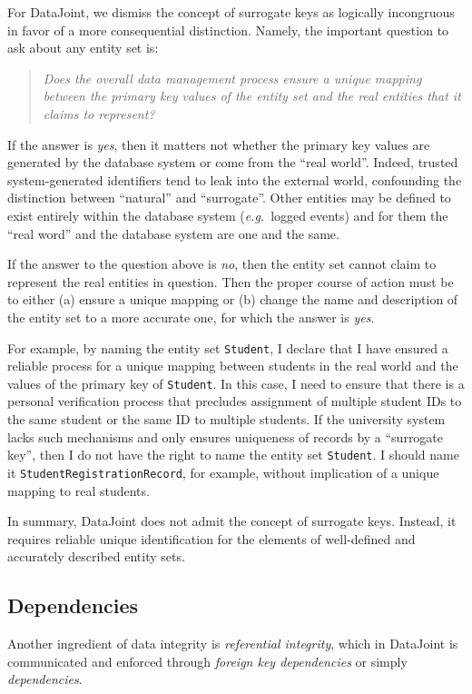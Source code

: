 \documentclass[letter,10pt]{article}
\newcommand{\datajoint}{DataJoint\xspace}
\begin{document}
For \datajoint, we dismiss the concept of surrogate keys as logically incongruous in favor of a more consequential distinction.
Namely, the important question to ask about any entity set is:
\begin{quote}
\em
Does the overall data management process ensure a unique mapping between the primary key values of the entity set and the real entities that it claims to represent?
\end{quote}

If the answer is \emph{yes}, then it matters not whether the primary key values are generated by the database system or come from the ``real world''. 
Indeed, trusted system-generated identifiers tend to leak into the external world, confounding the distinction between ``natural'' and ``surrogate''.
Other entities may be defined to exist entirely within the database system (\emph{e.g.}\ logged events) and for them the ``real word'' and the database system are one and the same.

If the answer to the question above is \emph{no}, then the entity set cannot claim to represent the real entities in question. 
Then the proper course of action must  be to either (a) ensure a unique mapping or (b) change the name and description of the entity set to a more accurate one, for which the answer is \emph{yes}. 

For example, by naming the entity set \lstinline$Student$, I declare that I have ensured a reliable process for a unique mapping between students in the real world and the values of the primary key of \lstinline$Student$.
In this case, I need to ensure that there is a personal verification process that precludes assignment of multiple student IDs to the same student or the same ID to multiple students.
If the university system lacks such mechanisms and only ensures uniqueness of records by a ``surrogate key'', then I do not have the right to name the entity set \lstinline$Student$.
I should name it \lstinline$StudentRegistrationRecord$, for example, without implication of a unique mapping to real students.

In summary, \datajoint does not admit the concept of surrogate keys.  
Instead, it requires reliable unique identification for the elements of well-defined and accurately described entity sets.

\subsection{Dependencies}
Another ingredient of data integrity is \emph{referential integrity}, which in \datajoint is communicated and enforced through \emph{foreign key dependencies} or simply \emph{dependencies}.
\end{document}
